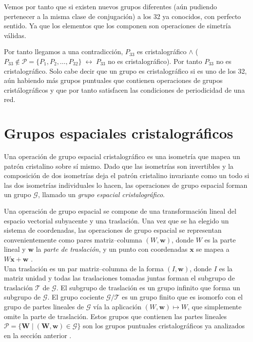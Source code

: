 \documentclass{report}
\begin{document}
\vspace{.2cm}

Vemos por tanto que si existen nuevos grupos diferentes (aún pudiendo pertenecer a la misma clase de conjugación)  a los 32 ya conocidos, con perfecto sentido. Ya que los elementos que los componen son operaciones de simetría válidas. \\
\vspace{.2cm}

 Por tanto llegamos a una contradicción, $P_{33}$ es cristalográfico $\wedge$ ($P_{33}\notin \mathcal{P} = \{ P_1, P_2, \ldots, P_{32} \}\;\leftrightarrow \; P_{33}
$ no es cristalográfico). Por tanto $P_{33}$ no es cristalográfico. Solo cabe decir que un grupo es cristalográfico si es uno de los 32, aún habiendo más grupos puntuales que contienen operaciones de grupos cristálográficos y que por tanto satisfacen las condiciones de periodicidad de una red.



\section{Grupos espaciales cristalográficos}



Una operación de grupo espacial cristalográfico es una isometría que mapea un patrón cristalino sobre sí mismo. Dado que las isometrías son invertibles y la composición de dos isometrías deja el patrón cristalino invariante como un todo si las dos isometrías individuales lo hacen, las operaciones de grupo espacial forman un grupo $\mathcal{G}$, llamado un \textit{grupo espacial cristalográfico}.\\
 
 \vspace{.2cm}

Una operación de grupo espacial se compone de una transformación lineal del espacio vectorial subyacente y una traslación. Una vez que se ha elegido un sistema de coordenadas, las operaciones de grupo espacial se representan convenientemente como pares matriz–columna $(W, \mathbf{w})$, donde $W$ es la parte lineal y $\mathbf{w}$ la \textit{parte de traslación}, y un punto con coordenadas $\mathbf{x}$ se mapea a $W\mathbf{x} + \mathbf{w}$ .\\
 \vspace{.2cm}
Una traslación es un par matriz–columna de la forma $(I, \mathbf{w})$, donde $I$ es la matriz unidad y todas las traslaciones tomadas juntas forman el subgrupo de traslación $\mathcal{T}$ de $\mathcal{G}$. El subgrupo de traslación es un grupo infinito que forma un subgrupo  de $\mathcal{G}$. El grupo cociente $\mathcal{G}/\mathcal{T}$ es un grupo finito que es isomorfo con el grupo de partes lineales de $\mathcal{G}$ vía la aplicación $(W, \mathbf{w}) \mapsto W$, que simplemente omite la parte de traslación. Estos grupos que contienen las partes lineales $\mathcal{P}=\{\textbf{W}\; \vert \; (\textbf{W},\textbf{w})\in \mathcal{G}\}$ son los grupos puntuales cristalográficos ya analizados en la sección anterior  .
\end{document}
